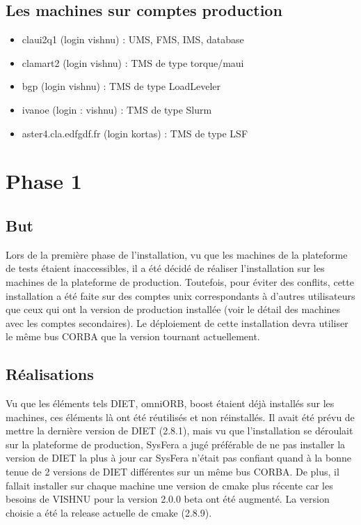 \documentclass{article}
\begin{document}
\subsection{Les machines sur comptes production}
\begin{itemize}
\item claui2q1 (login vishnu) : UMS, FMS, IMS, database
\item clamart2 (login vishnu) : TMS de type torque/maui
\item bgp (login vishnu) : TMS de type LoadLeveler
\item ivanoe (login : vishnu) : TMS de type  Slurm
\item aster4.cla.edfgdf.fr (login kortas) : TMS de type  LSF
\end{itemize}

\section{Phase 1}
\subsection{But}
Lors de la premi\`ere phase de l'installation, vu que les
machines de la plateforme de tests \'etaient inaccessibles,
il a \'et\'e décidé de r\'ealiser l'installation sur les machines de la
plateforme de production. Toutefois, pour \'eviter des
conflits, cette installation a \'et\'e faite sur des comptes
unix correspondants \`a d'autres utilisateurs que ceux 
qui ont la version de production install\'ee (voir le d\'etail
des machines avec les comptes secondaires). Le d\'eploiement
de cette installation devra utiliser le m\^eme bus CORBA 
que la version tournant actuellement. 

\subsection{R\'ealisations}
Vu que les \'el\'ements tels DIET, omniORB, boost \'etaient 
d\'ej\`a install\'es sur les machines, ces \'el\'ements l\`a
ont \'et\'e r\'eutilis\'es et non r\'einstall\'es. Il avait \'et\'e pr\'evu
de mettre la derni\`ere version de DIET (2.8.1), mais vu que l'installation
se d\'eroulait sur la plateforme de production,
SysFera a jug\'e pr\'ef\'erable de ne pas installer la
version de DIET la plus \`a jour car SysFera n'\'etait pas confiant
quand \`a la bonne tenue de 2 versions de DIET diff\'erentes sur un 
m\^eme bus CORBA. De plus, il fallait installer sur chaque machine
une version de cmake plus r\'ecente car les besoins de VISHNU pour 
la version 2.0.0 beta ont \'et\'e augment\'e. La version choisie a \'et\'e
la release actuelle de cmake (2.8.9).
\end{document}
